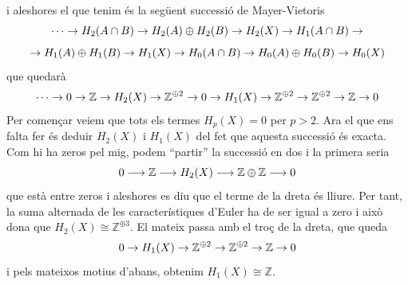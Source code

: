 \documentclass[../main.tex]{subfiles}
\begin{document}
\begin{sol}
\begin{equation}
\end{equation}
i aleshores el que tenim és la següent successió de Mayer-Vietoris
\begin{equation}
    \notag
    \cdots\rightarrow H_2(A\cap B)\rightarrow H_2(A)\oplus H_2(B)\rightarrow H_2(X)\rightarrow H_1(A\cap B)\rightarrow 
\end{equation}
\begin{equation}
    \notag
    \rightarrow H_1(A)\oplus H_1(B)\rightarrow H_1(X)\rightarrow H_0(A\cap B)\rightarrow H_0(A)\oplus H_0(B)\rightarrow H_0(X)
\end{equation}
que quedarà
\begin{equation}
    \notag
    \cdots\rightarrow 0\rightarrow\mathbb{Z}\rightarrow H_2(X)\rightarrow \mathbb{Z}^{\oplus 2}\rightarrow 0 \rightarrow H_1(X)\rightarrow \mathbb{Z}^{\oplus 2}\rightarrow \mathbb{Z}^{\oplus 2}\rightarrow \mathbb{Z}\rightarrow 0
\end{equation}
Per començar veiem que tots els termes $H_p(X) = 0$ per $p>2$. Ara el que ens falta fer és deduir $H_2(X)$ i $H_1(X)$ del fet que aquesta successió és exacta. Com hi ha zeros pel mig, podem ``partir'' la successió en dos i la primera seria
\begin{equation}
    \notag
    0\longrightarrow\mathbb{Z}\longrightarrow H_2(X)\longrightarrow \mathbb{Z}\oplus\mathbb{Z}\longrightarrow 0
\end{equation}
que està entre zeros i aleshores es diu que el terme de la dreta és lliure. Per tant, la suma alternada de les característiques d'Euler ha de ser igual a zero i això dona que $H_2(X)\cong\mathbb{Z}^{\oplus3}$. El mateix passa amb el troç de la dreta, que queda
\begin{equation}
    \notag
    0 \rightarrow H_1(X)\rightarrow \mathbb{Z}^{\oplus 2}\rightarrow \mathbb{Z}^{\oplus 2}\rightarrow \mathbb{Z}\rightarrow 0
\end{equation}
i pels mateixos motius d'abans, obtenim $H_1(X)\cong\mathbb{Z}$.
\end{sol}
\end{document}
